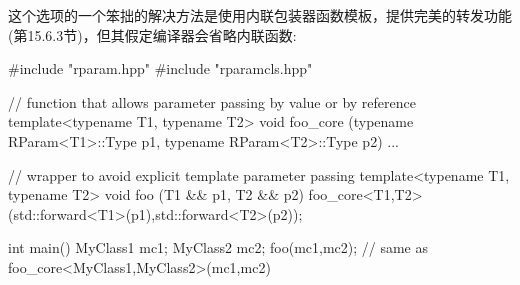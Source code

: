 这个选项的一个笨拙的解决方法是使用内联包装器函数模板，提供完美的转发功能(第15.6.3节)，但其假定编译器会省略内联函数:

\begin{cpp}
#include "rparam.hpp"
#include "rparamcls.hpp"

// function that allows parameter passing by value or by reference
template<typename T1, typename T2>
void foo_core (typename RParam<T1>::Type p1,
				typename RParam<T2>::Type p2)
{
	...
}

// wrapper to avoid explicit template parameter passing
template<typename T1, typename T2>
void foo (T1 && p1, T2 && p2)
{
	foo_core<T1,T2>(std::forward<T1>(p1),std::forward<T2>(p2));
}

int main()
{
	MyClass1 mc1;
	MyClass2 mc2;
	foo(mc1,mc2); // same as foo_core<MyClass1,MyClass2>(mc1,mc2)
}
\end{cpp}












